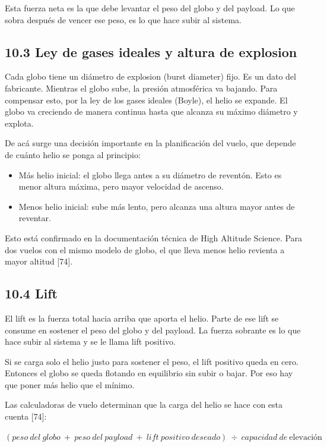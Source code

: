 \documentclass[12pt,a4paper]{article}
\begin{document}
Esta fuerza neta es la que debe levantar el peso del globo y del payload. Lo que sobra después de vencer ese peso, es lo que hace subir al sistema.

\subsection{10.3 Ley de gases ideales y altura de explosion}\label{ley-de-gases-ideales-y-altura-de-explosion}

Cada globo tiene un diámetro de explosion (burst diameter) fijo. Es un dato del fabricante. Mientras el globo sube, la presión atmosférica va bajando. Para compensar esto, por la ley de los gases ideales (Boyle), el helio se expande. El globo va creciendo de manera continua hasta que alcanza su máximo diámetro y explota.

De acá surge una decisión importante en la planificación del vuelo, que depende de cuánto helio se ponga al principio:

\begin{itemize}
\item
  Más helio inicial: el globo llega antes a su diámetro de reventón. Esto es menor altura máxima, pero mayor velocidad de ascenso.
\item
  Menos helio inicial: sube más lento, pero alcanza una altura mayor antes de reventar.
\end{itemize}

Esto está confirmado en la documentación técnica de High Altitude Science. Para dos vuelos con el mismo modelo de globo, el que lleva menos helio revienta a mayor altitud {[}74{]}.

\subsection{10.4 Lift}\label{lift}

El lift es la fuerza total hacia arriba que aporta el helio. Parte de ese lift se consume en sostener el peso del globo y del payload. La fuerza sobrante es lo que hace subir al sistema y se le llama lift positivo.

Si se carga solo el helio justo para sostener el peso, el lift positivo queda en cero. Entonces el globo se queda flotando en equilibrio sin subir o bajar. Por eso hay que poner más helio que el mínimo.

Las calculadoras de vuelo determinan que la carga del helio se hace con esta cuenta {[}74{]}:

\((peso\ del\ globo\  + \ peso\ del\ payload\  + \ lift\ positivo\ deseado)\  \div \ capacidad\ de\ \text{elevación}\)
\end{document}
